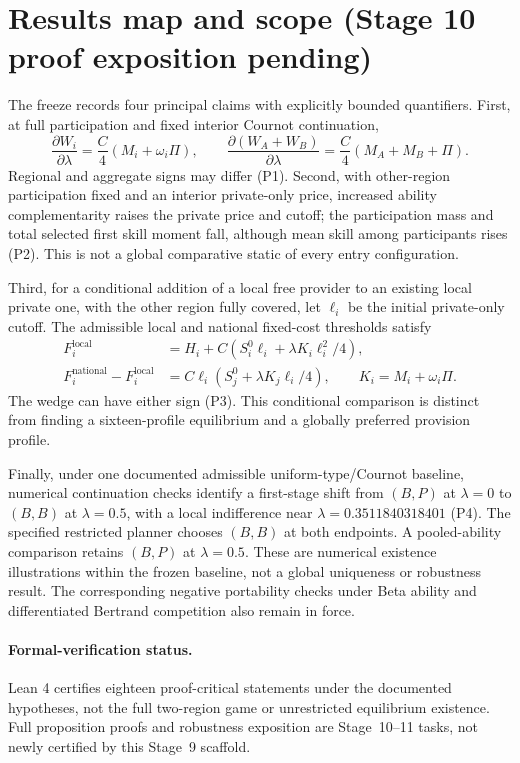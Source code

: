 \section{Results map and scope (Stage 10 proof exposition pending)}
The freeze records four principal claims with explicitly bounded quantifiers. First, at full participation and fixed interior Cournot continuation,
\begin{equation}
 \frac{\partial W_i}{\partial\lambda}=\frac{C}{4}(M_i+\omega_i\Pi),
 \qquad
 \frac{\partial(W_A+W_B)}{\partial\lambda}=\frac{C}{4}(M_A+M_B+\Pi).
\end{equation}
Regional and aggregate signs may differ (P1). Second, with other-region participation fixed and an interior private-only price, increased ability complementarity raises the private price and cutoff; the participation mass and total selected first skill moment fall, although mean skill among participants rises (P2). This is not a global comparative static of every entry configuration.

Third, for a conditional addition of a local free provider to an existing local private one, with the other region fully covered, let $\ell_i$ be the initial private-only cutoff. The admissible local and national fixed-cost thresholds satisfy
\begin{align}
 F_i^{\mathrm{local}}&=H_i+C\left(S_i^0\ell_i+\lambda K_i\ell_i^2/4\right),\\
 F_i^{\mathrm{national}}-F_i^{\mathrm{local}}
 &=C\ell_i\left(S_j^0+\lambda K_j\ell_i/4\right),
 \qquad K_i=M_i+\omega_i\Pi.
\end{align}
The wedge can have either sign (P3). This conditional comparison is distinct from finding a sixteen-profile equilibrium and a globally preferred provision profile.

Finally, under one documented admissible uniform-type/Cournot baseline, numerical continuation checks identify a first-stage shift from $(B,P)$ at $\lambda=0$ to $(B,B)$ at $\lambda=0.5$, with a local indifference near $\lambda=0.3511840318401$ (P4). The specified restricted planner chooses $(B,B)$ at both endpoints. A pooled-ability comparison retains $(B,P)$ at $\lambda=0.5$. These are numerical existence illustrations within the frozen baseline, not a global uniqueness or robustness result. The corresponding negative portability checks under Beta ability and differentiated Bertrand competition also remain in force.

\paragraph{Formal-verification status.} Lean 4 certifies eighteen proof-critical statements under the documented hypotheses, not the full two-region game or unrestricted equilibrium existence. Full proposition proofs and robustness exposition are Stage~10--11 tasks, not newly certified by this Stage~9 scaffold.
